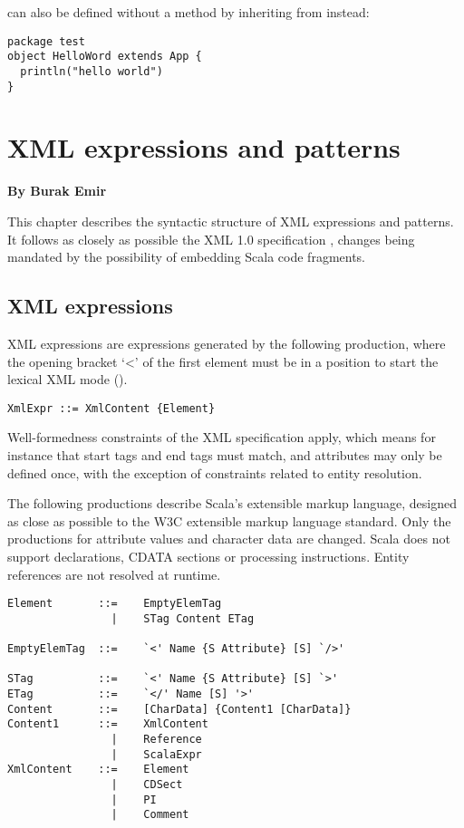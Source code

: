  can also be defined without a  method 
by inheriting from  instead:
\begin{lstlisting}
package test 
object HelloWord extends App {
  println("hello world")
}
\end{lstlisting}

\chapter{XML expressions and patterns}

{\bf By Burak Emir}\bigskip\bigskip


This chapter describes the syntactic structure of XML expressions and patterns.
It follows as closely as possible the XML 1.0 specification \cite{w3c:xml},
changes being mandated by the possibility of embedding Scala code fragments.

\section{XML expressions}
XML expressions are expressions generated by the following production, where the 
opening bracket `<' of the first element must be in a position to start the lexical
XML mode ().

\syntax\begin{lstlisting}
XmlExpr ::= XmlContent {Element}
\end{lstlisting}
Well-formedness constraints of the XML specification apply, which
means for instance that start tags and end tags must match, and
attributes may only be defined once, with the exception of constraints
related to entity resolution.

The following productions describe Scala's extensible markup language,
designed as close as possible to the W3C extensible markup language
standard. Only the productions for attribute values and character data
are changed. Scala does not support declarations, CDATA
sections or processing instructions. Entity references are not
resolved at runtime.

\syntax\begin{lstlisting}
Element       ::=    EmptyElemTag
                |    STag Content ETag                                       

EmptyElemTag  ::=    `<' Name {S Attribute} [S] `/>'                         

STag          ::=    `<' Name {S Attribute} [S] `>'                          
ETag          ::=    `</' Name [S] '>'                                        
Content       ::=    [CharData] {Content1 [CharData]}
Content1      ::=    XmlContent
                |    Reference
                |    ScalaExpr
XmlContent    ::=    Element
                |    CDSect
                |    PI
                |    Comment
\end{lstlisting}

